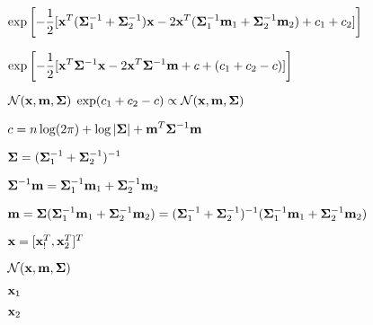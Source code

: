 \documentclass{article}
\def\lthtmlcheckvsize{\ifdim\ht\sizebox<\vsize 
  \ifdim\wd\sizebox<\hsize\expandafter\hfill\fi \expandafter\vfill
  \else\expandafter\vss\fi}%
\begin{document}
{\newpage\clearpage
{}%
$\displaystyle \exp\left[-\frac{1}{2}
[{\bf x}^T({\bf\Sigma}_1^{-1}+{\bf\Sigma}_2^{-1}){\bf x}
-2{\bf x}^T({\bf\Sigma}_1^{-1}{\bf m}_1+{\bf\Sigma}_2^{-1}{\bf m}_2)+c_1+c_2] \right]$%
\lthtmlindisplaymathZ
\lthtmlcheckvsize\clearpage}

{\newpage\clearpage
{}%
$\displaystyle \exp\left[-\frac{1}{2}
[{\bf x}^T{\bf\Sigma}^{-1}{\bf x}-2{\bf x}^T{\bf\Sigma}^{-1}{\bf m}+c
+(c_1+c_2-c)]\right]$%
\lthtmlindisplaymathZ
\lthtmlcheckvsize\clearpage}

{\newpage\clearpage
{}%
$\displaystyle {\cal N}({\bf x},{\bf m},{\bf\Sigma})\;\exp(c_1+c_2-c)
\propto {\cal N}({\bf x},{\bf m},{\bf\Sigma})$%
\lthtmlindisplaymathZ
\lthtmlcheckvsize\clearpage}

{\newpage\clearpage
{}%
$\displaystyle c=n\log(2\pi)+\log|{\bf\Sigma}|+{\bf m}^T{\bf\Sigma}^{-1}{\bf m}$%
\lthtmlindisplaymathZ
\lthtmlcheckvsize\clearpage}

{\newpage\clearpage
{}%
$\displaystyle {\bf\Sigma}=({\bf\Sigma}_1^{-1}+{\bf\Sigma}_2^{-1})^{-1}$%
\lthtmlindisplaymathZ
\lthtmlcheckvsize\clearpage}

{\newpage\clearpage
{}%
$\displaystyle {\bf\Sigma}^{-1}{\bf m}={\bf\Sigma}_1^{-1}{\bf m}_1+{\bf\Sigma}_2^{-1}{\bf m}_2$%
\lthtmlindisplaymathZ
\lthtmlcheckvsize\clearpage}

{\newpage\clearpage
{}%
$\displaystyle {\bf m}={\bf\Sigma}({\bf\Sigma}_1^{-1}{\bf m}_1+{\bf\Sigma}_2^{-1}{\bf m}_2)
=({\bf\Sigma}_1^{-1}+{\bf\Sigma}_2^{-1})^{-1}({\bf\Sigma}_1^{-1}{\bf m}_1+{\bf\Sigma}_2^{-1}{\bf m}_2)$%
\lthtmlindisplaymathZ
\lthtmlcheckvsize\clearpage}

{\newpage\clearpage
{}%
$ {\bf x}=[{\bf x}_!^T,{\bf x}_2^T]^T$%
\lthtmlindisplaymathZ
\lthtmlcheckvsize\clearpage}

{\newpage\clearpage
{}%
$ {\cal N}({\bf x},{\bf m},{\bf\Sigma})$%
\lthtmlindisplaymathZ
\lthtmlcheckvsize\clearpage}

{\newpage\clearpage
{}%
$ {\bf x}_1$%
\lthtmlindisplaymathZ
\lthtmlcheckvsize\clearpage}

{\newpage\clearpage
{}%
$ {\bf x}_2$%
\lthtmlindisplaymathZ
\lthtmlcheckvsize\clearpage}
\end{document}

